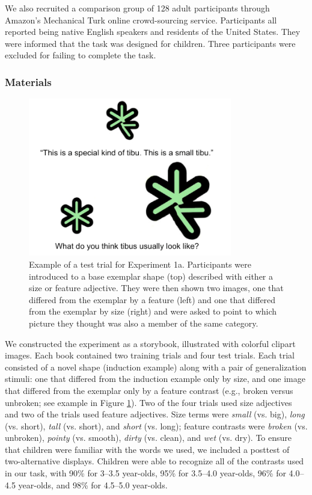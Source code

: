\documentclass[man]{apa2}
\begin{document}
We also recruited a comparison group of 128 adult participants through Amazon's Mechanical Turk online crowd-sourcing service.  Participants all reported being native English speakers and residents of the United States. They were informed that the task was designed for children. Three participants were excluded for failing to complete the task.  

\subsubsection{Materials}

\begin{figure}[t]
  \begin{center} 
    \includegraphics[width=3.5in]{figures/inanimate_demo.png} 
    \caption{\label{fig:inanimate_demo} Example of a test trial for Experiment 1a.  Participants were introduced to a base exemplar shape (top) described with either a size or feature adjective.  They were then shown two images, one that differed from the exemplar by a feature (left) and one that differed from the exemplar by size (right) and were asked to point to which picture they thought was also a member of the same category. } 
  \end{center} 
\end{figure}	

We constructed the experiment as a storybook, illustrated with colorful clipart images. Each book contained two training trials and four test trials. Each trial consisted of a novel shape (induction example) along with a pair of generalization stimuli: one that differed from the induction example only by size, and one image that differed from the exemplar only by a feature contrast (e.g., broken versus unbroken; see example in Figure \ref{fig:inanimate_demo}). Two of the four trials used size adjectives and two of the trials used feature adjectives.
Size terms were \emph{small} (vs. big), \emph{long} (vs. short), \emph{tall} (vs. short), and \emph{short} (vs. long);  feature contrasts were \emph{broken} (vs. unbroken), \emph{pointy} (vs. smooth), \emph{dirty} (vs. clean), and \emph{wet} (vs. dry).  To ensure that children were familiar with the words we used, we included a posttest of two-alternative displays.  Children were able to recognize all of the contrasts used in our task, with 90\% for 3--3.5 year-olds, 95\% for 3.5--4.0 year-olds, 96\% for 4.0--4.5 year-olds, and 98\% for 4.5--5.0 year-olds.  
\end{document}
